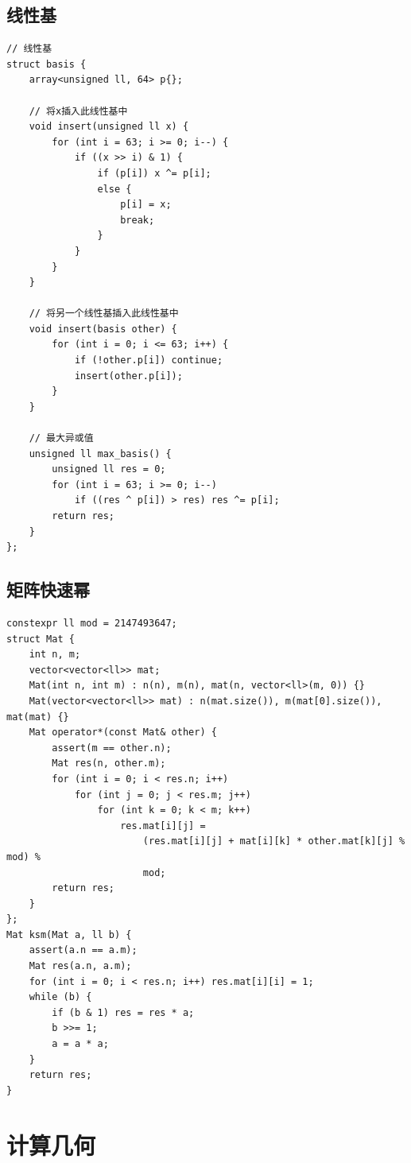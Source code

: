\documentclass[UTF8]{ctexart}
\begin{document}
\begin{sloppypar}
\subsection{线性基}

\begin{lstlisting}[style=cpp]
// 线性基
struct basis {
    array<unsigned ll, 64> p{};

    // 将x插入此线性基中
    void insert(unsigned ll x) {
        for (int i = 63; i >= 0; i--) {
            if ((x >> i) & 1) {
                if (p[i]) x ^= p[i];
                else {
                    p[i] = x;
                    break;
                }
            }
        }
    }

    // 将另一个线性基插入此线性基中
    void insert(basis other) {
        for (int i = 0; i <= 63; i++) {
            if (!other.p[i]) continue;
            insert(other.p[i]);
        }
    }

    // 最大异或值
    unsigned ll max_basis() {
        unsigned ll res = 0;
        for (int i = 63; i >= 0; i--)
            if ((res ^ p[i]) > res) res ^= p[i];
        return res;
    }
};
\end{lstlisting}

\subsection{矩阵快速幂}

\begin{lstlisting}[style=cpp]
constexpr ll mod = 2147493647;
struct Mat {
    int n, m;
    vector<vector<ll>> mat;
    Mat(int n, int m) : n(n), m(n), mat(n, vector<ll>(m, 0)) {}
    Mat(vector<vector<ll>> mat) : n(mat.size()), m(mat[0].size()), mat(mat) {}
    Mat operator*(const Mat& other) {
        assert(m == other.n);
        Mat res(n, other.m);
        for (int i = 0; i < res.n; i++)
            for (int j = 0; j < res.m; j++)
                for (int k = 0; k < m; k++)
                    res.mat[i][j] =
                        (res.mat[i][j] + mat[i][k] * other.mat[k][j] % mod) %
                        mod;
        return res;
    }
};
Mat ksm(Mat a, ll b) {
    assert(a.n == a.m);
    Mat res(a.n, a.m);
    for (int i = 0; i < res.n; i++) res.mat[i][i] = 1;
    while (b) {
        if (b & 1) res = res * a;
        b >>= 1;
        a = a * a;
    }
    return res;
}
\end{lstlisting}

\clearpage

\section{计算几何}


\end{sloppypar}
\end{document}
